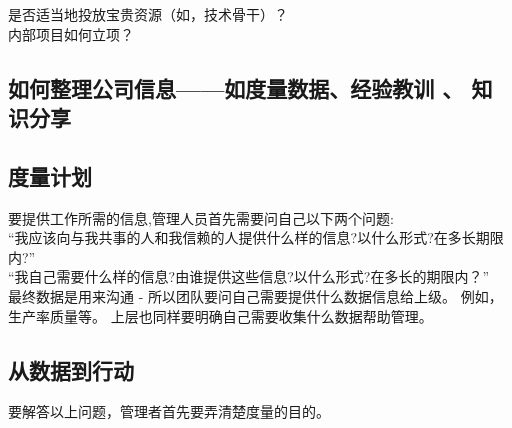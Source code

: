 是否适当地投放宝贵资源（如，技术骨干）？\\
内部项目如何立项？\\


\hypertarget{ux5982ux4f55ux6574ux7406ux516cux53f8ux4fe1ux606fux5982ux5ea6ux91cfux6570ux636eux7ecfux9a8cux6559ux8bad-ux77e5ux8bc6ux5206ux4eab}{%
\subsection{如何整理公司信息------如度量数据、经验教训 、
知识分享}\label{ux5982ux4f55ux6574ux7406ux516cux53f8ux4fe1ux606fux5982ux5ea6ux91cfux6570ux636eux7ecfux9a8cux6559ux8bad-ux77e5ux8bc6ux5206ux4eab}}

\hypertarget{ux5ea6ux91cfux8ba1ux5212}{%
\subsection{度量计划}\label{ux5ea6ux91cfux8ba1ux5212}}

要提供工作所需的信息,管理人员首先需要问自己以下两个问题:\\
``我应该向与我共事的人和我信赖的人提供什么样的信息?以什么形式?在多长期限内?''\\
``我自己需要什么样的信息?由谁提供这些信息?以什么形式?在多长的期限内？''\\
最终数据是用来沟通 - 所以团队要问自己需要提供什么数据信息给上级。
例如，生产率质量等。 上层也同样要明确自己需要收集什么数据帮助管理。\\

\hypertarget{ux4eceux6570ux636eux5230ux884cux52a8}{%
\subsection{从数据到行动}\label{ux4eceux6570ux636eux5230ux884cux52a8}}

要解答以上问题，管理者首先要弄清楚度量的目的。

